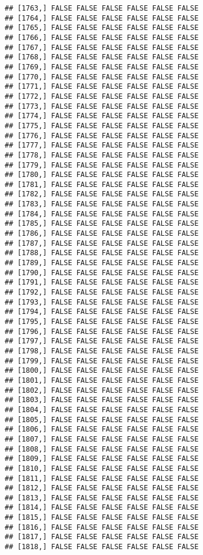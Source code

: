 \documentclass[
]{article}
\begin{document}
\begin{verbatim}
## [1763,] FALSE FALSE FALSE FALSE FALSE FALSE
## [1764,] FALSE FALSE FALSE FALSE FALSE FALSE
## [1765,] FALSE FALSE FALSE FALSE FALSE FALSE
## [1766,] FALSE FALSE FALSE FALSE FALSE FALSE
## [1767,] FALSE FALSE FALSE FALSE FALSE FALSE
## [1768,] FALSE FALSE FALSE FALSE FALSE FALSE
## [1769,] FALSE FALSE FALSE FALSE FALSE FALSE
## [1770,] FALSE FALSE FALSE FALSE FALSE FALSE
## [1771,] FALSE FALSE FALSE FALSE FALSE FALSE
## [1772,] FALSE FALSE FALSE FALSE FALSE FALSE
## [1773,] FALSE FALSE FALSE FALSE FALSE FALSE
## [1774,] FALSE FALSE FALSE FALSE FALSE FALSE
## [1775,] FALSE FALSE FALSE FALSE FALSE FALSE
## [1776,] FALSE FALSE FALSE FALSE FALSE FALSE
## [1777,] FALSE FALSE FALSE FALSE FALSE FALSE
## [1778,] FALSE FALSE FALSE FALSE FALSE FALSE
## [1779,] FALSE FALSE FALSE FALSE FALSE FALSE
## [1780,] FALSE FALSE FALSE FALSE FALSE FALSE
## [1781,] FALSE FALSE FALSE FALSE FALSE FALSE
## [1782,] FALSE FALSE FALSE FALSE FALSE FALSE
## [1783,] FALSE FALSE FALSE FALSE FALSE FALSE
## [1784,] FALSE FALSE FALSE FALSE FALSE FALSE
## [1785,] FALSE FALSE FALSE FALSE FALSE FALSE
## [1786,] FALSE FALSE FALSE FALSE FALSE FALSE
## [1787,] FALSE FALSE FALSE FALSE FALSE FALSE
## [1788,] FALSE FALSE FALSE FALSE FALSE FALSE
## [1789,] FALSE FALSE FALSE FALSE FALSE FALSE
## [1790,] FALSE FALSE FALSE FALSE FALSE FALSE
## [1791,] FALSE FALSE FALSE FALSE FALSE FALSE
## [1792,] FALSE FALSE FALSE FALSE FALSE FALSE
## [1793,] FALSE FALSE FALSE FALSE FALSE FALSE
## [1794,] FALSE FALSE FALSE FALSE FALSE FALSE
## [1795,] FALSE FALSE FALSE FALSE FALSE FALSE
## [1796,] FALSE FALSE FALSE FALSE FALSE FALSE
## [1797,] FALSE FALSE FALSE FALSE FALSE FALSE
## [1798,] FALSE FALSE FALSE FALSE FALSE FALSE
## [1799,] FALSE FALSE FALSE FALSE FALSE FALSE
## [1800,] FALSE FALSE FALSE FALSE FALSE FALSE
## [1801,] FALSE FALSE FALSE FALSE FALSE FALSE
## [1802,] FALSE FALSE FALSE FALSE FALSE FALSE
## [1803,] FALSE FALSE FALSE FALSE FALSE FALSE
## [1804,] FALSE FALSE FALSE FALSE FALSE FALSE
## [1805,] FALSE FALSE FALSE FALSE FALSE FALSE
## [1806,] FALSE FALSE FALSE FALSE FALSE FALSE
## [1807,] FALSE FALSE FALSE FALSE FALSE FALSE
## [1808,] FALSE FALSE FALSE FALSE FALSE FALSE
## [1809,] FALSE FALSE FALSE FALSE FALSE FALSE
## [1810,] FALSE FALSE FALSE FALSE FALSE FALSE
## [1811,] FALSE FALSE FALSE FALSE FALSE FALSE
## [1812,] FALSE FALSE FALSE FALSE FALSE FALSE
## [1813,] FALSE FALSE FALSE FALSE FALSE FALSE
## [1814,] FALSE FALSE FALSE FALSE FALSE FALSE
## [1815,] FALSE FALSE FALSE FALSE FALSE FALSE
## [1816,] FALSE FALSE FALSE FALSE FALSE FALSE
## [1817,] FALSE FALSE FALSE FALSE FALSE FALSE
## [1818,] FALSE FALSE FALSE FALSE FALSE FALSE

\end{verbatim}
\end{document}
